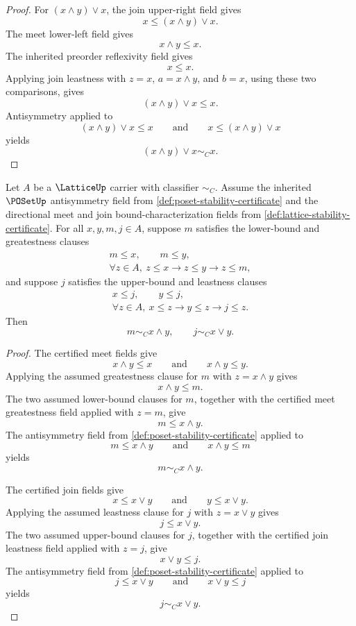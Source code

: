 \begin{proof}
For \((x\wedge y)\vee x\), the join upper-right field gives
$$
  x\le (x\wedge y)\vee x .
$$
The meet lower-left field gives
$$
  x\wedge y\le x .
$$
The inherited preorder reflexivity field gives
$$
  x\le x .
$$
Applying join leastness with \(z=x\), \(a=x\wedge y\), and \(b=x\), using these two comparisons, gives
$$
  (x\wedge y)\vee x\le x .
$$
Antisymmetry applied to
$$
  (x\wedge y)\vee x\le x
  \qquad\text{and}\qquad
  x\le (x\wedge y)\vee x
$$
yields
$$
  (x\wedge y)\vee x\sim_C x .
$$
\end{proof}

\begin{theorem}
\label{thm:lattice-bound-uniqueness-from-directional-certificates}
Let $A$ be a $\LatticeUp$ carrier with classifier $\sim_C$. Assume the inherited $\POSetUp$ antisymmetry field from \autoref{def:poset-stability-certificate} and the directional meet and join bound-characterization fields from \autoref{def:lattice-stability-certificate}. For all $x,y,m,j\in A$, suppose $m$ satisfies the lower-bound and greatestness clauses
$$
\begin{gathered}
m\le x,\qquad m\le y,\\
\forall z\in A,\ z\le x\to z\le y\to z\le m,
\end{gathered}
$$
and suppose $j$ satisfies the upper-bound and leastness clauses
$$
\begin{gathered}
x\le j,\qquad y\le j,\\
\forall z\in A,\ x\le z\to y\le z\to j\le z.
\end{gathered}
$$
Then
$$
m\sim_C x\wedge y,\qquad j\sim_C x\vee y .
$$
\end{theorem}
\begin{proof}
The certified meet fields give
$$
x\wedge y\le x
\qquad\text{and}\qquad
x\wedge y\le y .
$$
Applying the assumed greatestness clause for $m$ with $z=x\wedge y$ gives
$$
x\wedge y\le m .
$$
The two assumed lower-bound clauses for $m$, together with the certified meet greatestness field applied with $z=m$, give
$$
m\le x\wedge y .
$$
The antisymmetry field from \autoref{def:poset-stability-certificate} applied to
$$
m\le x\wedge y
\qquad\text{and}\qquad
x\wedge y\le m
$$
yields
$$
m\sim_C x\wedge y .
$$

The certified join fields give
$$
x\le x\vee y
\qquad\text{and}\qquad
y\le x\vee y .
$$
Applying the assumed leastness clause for $j$ with $z=x\vee y$ gives
$$
j\le x\vee y .
$$
The two assumed upper-bound clauses for $j$, together with the certified join leastness field applied with $z=j$, give
$$
x\vee y\le j .
$$
The antisymmetry field from \autoref{def:poset-stability-certificate} applied to
$$
j\le x\vee y
\qquad\text{and}\qquad
x\vee y\le j
$$
yields
$$
j\sim_C x\vee y .
$$
\end{proof}

